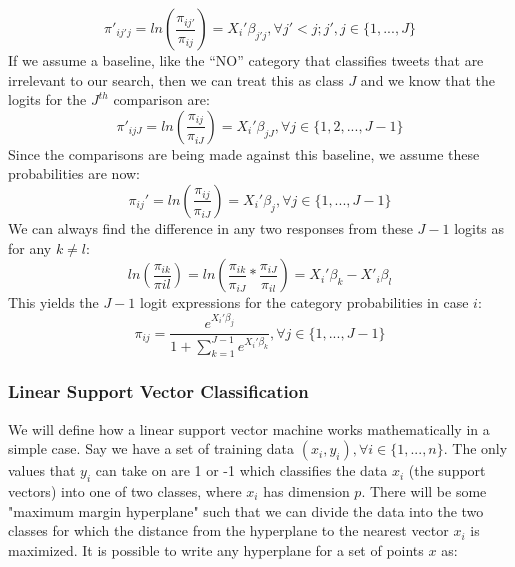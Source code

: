 \documentclass[titlepage, 12pt]{article}
\begin{document}
\begin{equation}
    \pi'_{ij'j} = ln(\frac{\pi_{ij'}}{\pi_{ij}}) = X_i'\beta_{j'j}, \forall j'<j; j',j \in \{1,..., J\} 
\end{equation}
If we assume a baseline, like the ``NO'' category that classifies tweets that are irrelevant to our search, then we can treat this as class $J$ and we know that the logits for the $J^{th}$ comparison are:
\begin{equation}
    \pi'_{ijJ} = ln(\frac{\pi_{ij}}{\pi_{iJ}}) = X_i'\beta_{jJ}, \forall j \in \{1,2,...,J-1\}
\end{equation}
Since the comparisons are being made against this baseline, we assume these probabilities are now:
\begin{equation}
    \pi_{ij}' = ln(\frac{\pi_{ij}}{\pi_{iJ}}) = X_i'\beta_j, \forall j \in \{1, ..., J-1\}
\end{equation}
We can always find the difference in any two responses from these $J-1$ logits as for any $k \neq l$:
\begin{equation}
    ln(\frac{\pi_{ik}}{\pi{il}}) = ln(\frac{\pi_{ik}}{\pi_{iJ}} * \frac{\pi_{iJ}}{\pi_{il}}) = X_i'\beta_k - X'_i\beta_l
\end{equation}
This yields the $J-1$ logit expressions for the category probabilities in case $i$:
\begin{equation}
    \pi_{ij} = \frac{e^{X_i'\beta_j}}{1 + \sum_{k=1}^{J-1} e^{X_i'\beta_k}}, \forall j \in \{1, ..., J-1\}
\end{equation}
\citep{alsm.2005}

\subsubsection{Linear Support Vector Classification}
\hspace{0.5 cm}We will define how a linear support vector machine works mathematically in a simple case. Say we have a set of training data $(x_i, y_i), \forall i \in\{1,...,n\}$. The only values that $y_i$ can take on are 1 or -1 which classifies the data $x_i$ (the support vectors) into one of two classes, where $x_i$ has dimension $p$. There will be some "maximum margin hyperplane" such that we can divide the data into the two classes for which the distance from the hyperplane to the nearest vector $x_i$ is maximized. It is possible to write any hyperplane for a set of points $x$ as:
\end{document}
